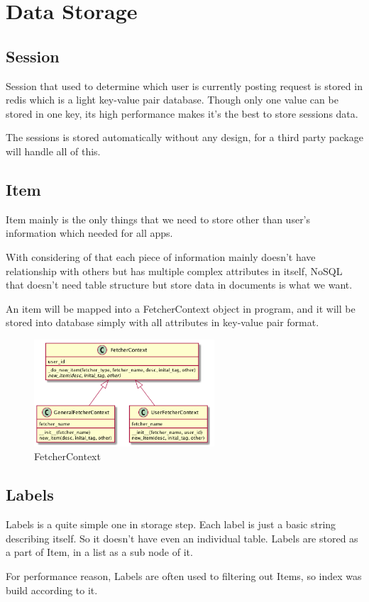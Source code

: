 \section{Data Storage}
  \subsection{Session}
    Session that used to determine which user is currently posting request is stored in redis which is a light key-value pair database.
    Though only one value can be stored in one key, its high performance makes it's the best to store sessions data.

    The sessions is stored automatically without any design, for a third party package will handle all of this.

  \subsection{Item}
    Item mainly is the only things that we need to store other than user's information which needed for all apps.

    With considering of that each piece of information mainly doesn't have relationship with others but has multiple complex attributes in itself,
    NoSQL that doesn't need table structure but store data in documents is what we want.

    An item will be mapped into a FetcherContext object in program, and it will be stored into database simply with all attributes
    in key-value pair format.

    \begin{figure}[H]
      \centering
      \includegraphics[width=0.6\textwidth]{img/fetcherContext.png}
      \caption{FetcherContext\label{fig:fetcherContext}}
    \end{figure}

  \subsection{Labels}
    Labels is a quite simple one in storage step.
    Each label is just a basic string describing itself. So it doesn't have even an individual table.
    Labels are stored as a part of Item, in a list as a sub node of it.

    For performance reason, Labels are often used to filtering out Items, so index was build according to it.

